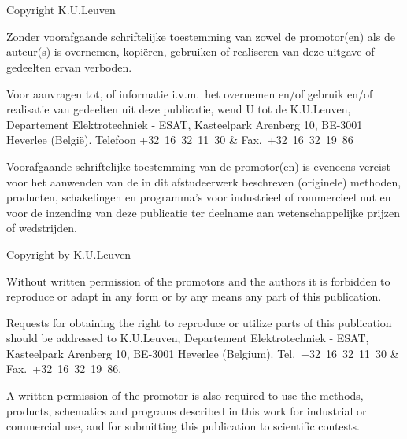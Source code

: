 \section*{}
\thispagestyle{empty}

\vfill

Copyright K.U.Leuven

\bigskip \noindent Zonder voorafgaande schriftelijke toestemming van zowel de promotor(en) als de auteur(s) is overnemen, kopi\"eren, gebruiken of realiseren van deze uitgave of gedeelten ervan verboden. 

\medskip \noindent Voor aanvragen tot, of informatie i.v.m.\ het overnemen en/of gebruik en/of realisatie van gedeelten uit deze publicatie, wend U tot de K.U.Leuven, Departement Elektrotechniek - ESAT, Kasteelpark Arenberg 10, BE-3001 Heverlee (Belgi\"e). Telefoon \mbox{+32 16 32 11 30} \& Fax.\ \mbox{+32 16 32 19 86}

\medskip \noindent Voorafgaande schriftelijke toestemming van de promotor(en) is eveneens vereist voor het aanwenden van de in dit afstudeerwerk beschreven (originele) methoden, producten, schakelingen en programma's voor industrieel of commercieel nut en voor de inzending van deze publicatie ter deelname aan wetenschappelijke prijzen of wedstrijden.

\bigskip
\bigskip
\bigskip

\noindent Copyright by K.U.Leuven

\bigskip \noindent Without written permission of the promotors and the authors it is forbidden to reproduce or adapt in any form or by any means any part of this publication. 

\medskip \noindent Requests for obtaining the right to reproduce or utilize parts of this publication should be addressed to K.U.Leuven, Departement Elektrotechniek - ESAT, Kasteelpark Arenberg 10,  BE-3001 Heverlee  (Belgium). Tel.\ \mbox{+32 16 32 11 30} \& Fax.\ \mbox{+32 16 32 19 86}.

\medskip \noindent A written permission of the promotor is also required to use the methods, products, schematics and programs described in this work for industrial or commercial use, and for submitting this publication to scientific contests.

\clearpage
